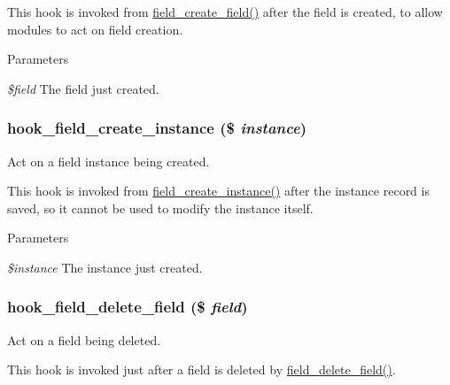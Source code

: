 This hook is invoked from \hyperlink{group__field__crud_ga0f879889d2da2b5d638252d7eb027746}{field\_\-create\_\-field()} after the field is created, to allow modules to act on field creation.


\begin{DoxyParams}{Parameters}
\item[{\em \$field}]The field just created. \end{DoxyParams}
\hypertarget{group__field__crud_ga199cb6235866c98ab74a6680bb00b17a}{
\subsubsection[{hook\_\-field\_\-create\_\-instance}]{\setlength{\rightskip}{0pt plus 5cm}hook\_\-field\_\-create\_\-instance (\$ {\em instance})}}
\label{group__field__crud_ga199cb6235866c98ab74a6680bb00b17a}
Act on a field instance being created.

This hook is invoked from \hyperlink{group__field__crud_ga3a1e23613d572a6e908e063c3a0335f8}{field\_\-create\_\-instance()} after the instance record is saved, so it cannot be used to modify the instance itself.


\begin{DoxyParams}{Parameters}
\item[{\em \$instance}]The instance just created. \end{DoxyParams}
\hypertarget{group__field__crud_gacc586bd79943816012827d165b668aab}{
\subsubsection[{hook\_\-field\_\-delete\_\-field}]{\setlength{\rightskip}{0pt plus 5cm}hook\_\-field\_\-delete\_\-field (\$ {\em field})}}
\label{group__field__crud_gacc586bd79943816012827d165b668aab}
Act on a field being deleted.

This hook is invoked just after a field is deleted by \hyperlink{group__field__crud_gaa4792fd8f5f651b985dec7eca250f0f1}{field\_\-delete\_\-field()}.


